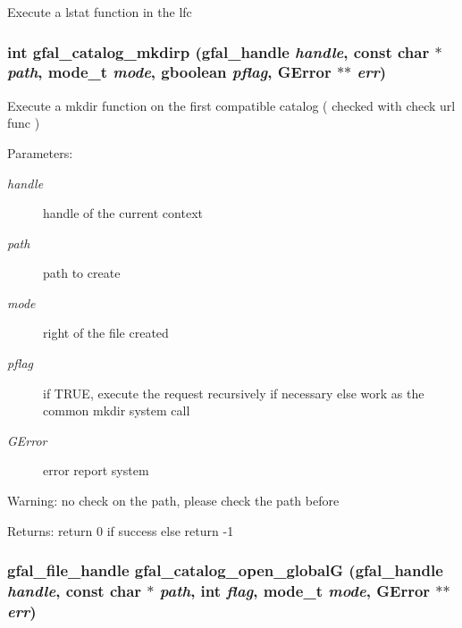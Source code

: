 Execute a lstat function in the lfc 
\subsubsection{\setlength{\rightskip}{0pt plus 5cm}int gfal\_\-catalog\_\-mkdirp (gfal\_\-handle {\em handle}, const char $\ast$ {\em path}, mode\_\-t {\em mode}, gboolean {\em pflag}, GError $\ast$$\ast$ {\em err})}\label{gfal__common__catalog_8h_93da9b37bece0b034d80c17131761110}


Execute a mkdir function on the first compatible catalog ( checked with check url func ) \begin{Desc}
\item[Parameters:]
\begin{description}
\item[{\em handle}]handle of the current context \item[{\em path}]path to create \item[{\em mode}]right of the file created \item[{\em pflag}]if TRUE, execute the request recursively if necessary else work as the common mkdir system call \item[{\em GError}]error report system \end{description}
\end{Desc}
\begin{Desc}
\item[Warning:]no check on the path, please check the path before \end{Desc}
\begin{Desc}
\item[Returns:]return 0 if success else return -1 \end{Desc}
\subsubsection{\setlength{\rightskip}{0pt plus 5cm}gfal\_\-file\_\-handle gfal\_\-catalog\_\-open\_\-global\-G (gfal\_\-handle {\em handle}, const char $\ast$ {\em path}, int {\em flag}, mode\_\-t {\em mode}, GError $\ast$$\ast$ {\em err})}\label{gfal__common__catalog_8h_6698bf5c6d4e83f3734ac0793664894f}



